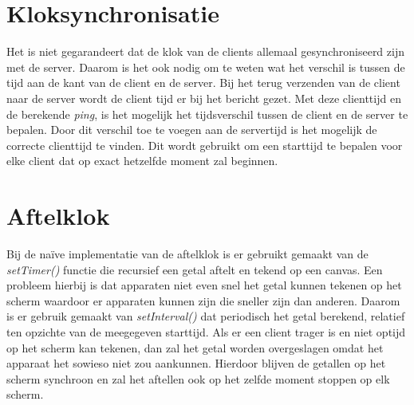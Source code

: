 \documentclass[a4paper,11pt]{article}
\begin{document}
\section{Kloksynchronisatie}
Het is niet gegarandeert dat de klok van de clients allemaal gesynchroniseerd zijn met de server. Daarom is het ook nodig om te weten wat het verschil is tussen de tijd aan de kant van de client en de server.
Bij het terug verzenden van de client naar de server wordt de client tijd er bij het bericht gezet. Met deze clienttijd en de berekende {\it ping}, is het mogelijk het tijdsverschil tussen de client en de server te bepalen. Door dit verschil toe te voegen aan de servertijd is het mogelijk de correcte clienttijd te vinden. Dit wordt gebruikt om een starttijd te bepalen voor elke client dat op exact hetzelfde moment zal beginnen.

\section{Aftelklok}
Bij de naïve implementatie van de aftelklok is er gebruikt gemaakt van de {\it setTimer()} functie die recursief een getal aftelt en tekend op een canvas. Een probleem hierbij is dat apparaten niet even snel het getal kunnen tekenen op het scherm waardoor er apparaten kunnen zijn die sneller zijn dan anderen.
Daarom is er gebruik gemaakt van {\it setInterval()} dat periodisch het getal berekend, relatief ten opzichte van de meegegeven starttijd. Als er een client trager is en niet optijd op het scherm kan tekenen, dan zal het getal worden overgeslagen omdat het apparaat het sowieso niet zou aankunnen. Hierdoor blijven de getallen op het scherm synchroon en zal het aftellen ook op het zelfde moment stoppen op elk scherm.
\end{document}
